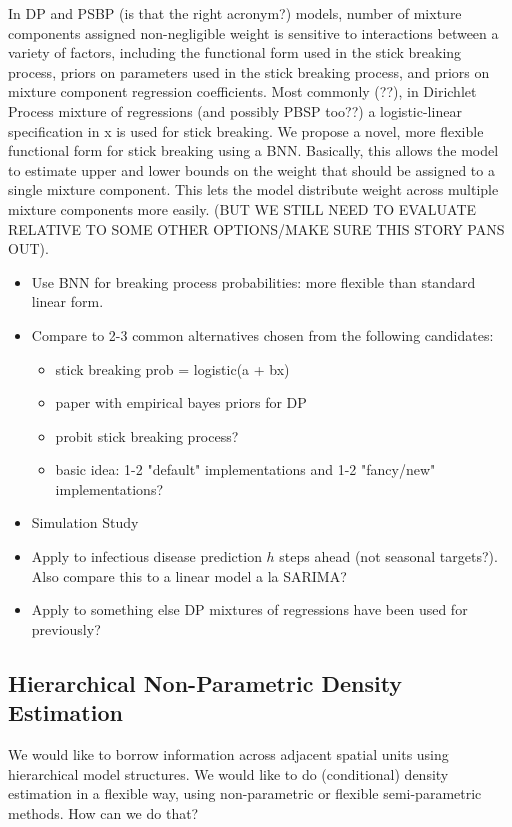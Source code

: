 \documentclass{article}
\begin{document}
In DP and PSBP (is that the right acronym?) models, number of mixture components assigned non-negligible weight is sensitive to interactions between a variety of factors, including the functional form used in the stick breaking process, priors on parameters used in the stick breaking process, and priors on mixture component regression coefficients.  Most commonly (??), in Dirichlet Process mixture of regressions (and possibly PBSP too??) a logistic-linear specification in x is used for stick breaking.  We propose a novel, more flexible functional form for stick breaking using a BNN.  Basically, this allows the model to estimate upper and lower bounds on the weight that should be assigned to a single mixture component.  This lets the model distribute weight across multiple mixture components more easily.  (BUT WE STILL NEED TO EVALUATE RELATIVE TO SOME OTHER OPTIONS/MAKE SURE THIS STORY PANS OUT).

\begin{itemize}
\item Use BNN for breaking process probabilities: more flexible than standard linear form.
\item Compare to 2-3 common alternatives chosen from the following candidates:
  \begin{itemize}
  \item stick breaking prob = logistic(a + bx)
  \item paper with empirical bayes priors for DP
  \item probit stick breaking process?
  \item basic idea: 1-2 "default" implementations and 1-2 "fancy/new" implementations?
  \end{itemize}
\item Simulation Study
\item Apply to infectious disease prediction $h$ steps ahead (not seasonal targets?).  Also compare this to a linear model a la SARIMA?
\item Apply to something else DP mixtures of regressions have been used for previously?
\end{itemize}


\subsection{Hierarchical Non-Parametric Density Estimation}

We would like to borrow information across adjacent spatial units using hierarchical model structures.  We would like to do (conditional) density estimation in a flexible way, using non-parametric or flexible semi-parametric methods.  How can we do that?
\end{document}
